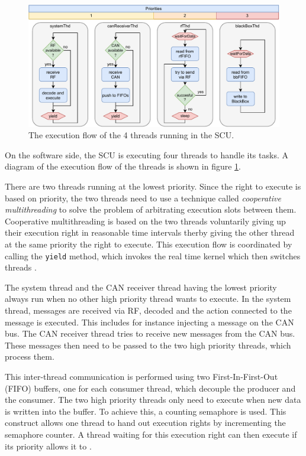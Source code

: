\documentclass[conference]{IEEEtran}
\begin{document}
\begin{figure}
    \centering
    \includegraphics[width=\linewidth]{documentation/images/SCU_threads.pdf}
    \caption{The execution flow of the 4 threads running in the SCU.}
    \label{fig:SCU_threads}
\end{figure}

On the software side, the SCU is executing four threads to handle its tasks. A diagram of the execution flow of the threads is shown in figure \ref{fig:SCU_threads}. 

There are two threads running at the lowest priority. Since the right to execute is based on priority, the two threads need to use a technique called \textit{cooperative multithreading} to solve the problem of arbitrating execution slots between them. Cooperative multithreading is based on the two threads voluntarily giving up their execution right in reasonable time intervals therby giving the other thread at the same priority the right to execute. This execution flow is coordinated by calling the \texttt{yield} method, which invokes the real time kernel which then switches threads \cite{chibiOsYield}.

The system thread and the CAN receiver thread having the lowest priority always run when no other high priority thread wants to execute. In the system thread, messages are received via RF, decoded and the action connected to the message is executed. This includes for instance injecting a message on the CAN bus. The CAN receiver thread tries to receive new messages from the CAN bus. These messages then need to be passed to the two high priority threads, which process them.

This inter-thread communication is performed using two First-In-First-Out (FIFO) buffers, one for each consumer thread, which decouple the producer and the consumer. The two high priority threads only need to execute when new data is written into the buffer. To achieve this, a counting semaphore is used. This construct allows one thread to hand out execution rights by incrementing the semaphore counter. A thread waiting for this execution right can then execute if its priority allows it to \cite{chibiOsSemaphore}. 
\end{document}
